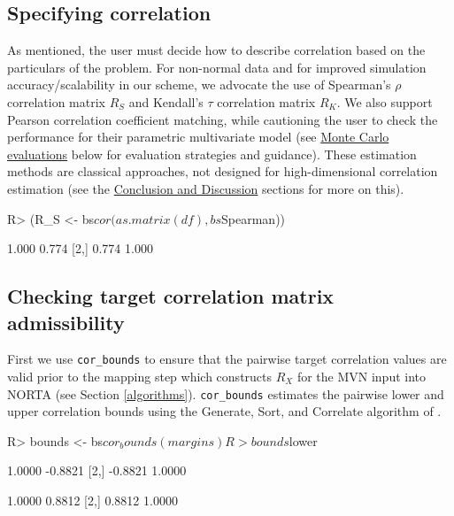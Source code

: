\documentclass[
]{jss}
\begin{document}
\hypertarget{specifying-correlation}{%
\subsection{Specifying correlation}\label{specifying-correlation}}

As mentioned, the user must decide how to describe correlation based on the particulars of the problem. For non-normal data and for improved simulation accuracy/scalability in our scheme, we advocate the use of Spearman's \(\rho\) correlation matrix \(R_S\) and Kendall's \(\tau\) correlation matrix \(R_K\). We also support Pearson correlation coefficient matching, while cautioning the user to check the performance for their parametric multivariate model (see \protect\hyperlink{simulations}{Monte Carlo evaluations} below for evaluation strategies and guidance). These estimation methods are classical approaches, not designed for high-dimensional correlation estimation (see the \href{\%7B\#discussion}{Conclusion and Discussion} sections for more on this).

\begin{CodeChunk}
\begin{CodeInput}
R> (R_S <- bs$cor(as.matrix(df), bs$Spearman))
\end{CodeInput}
\begin{CodeOutput}
      [,1]  [,2]
[1,] 1.000 0.774
[2,] 0.774 1.000
\end{CodeOutput}
\end{CodeChunk}

\hypertarget{checking-target-correlation-matrix-admissibility}{%
\subsection{Checking target correlation matrix admissibility}\label{checking-target-correlation-matrix-admissibility}}

First we use \texttt{cor\_bounds} to ensure that the pairwise target correlation values are valid prior to the mapping step which constructs \(R_X\) for the MVN input into NORTA (see Section \ref{algorithms}). \texttt{cor\_bounds} estimates the pairwise lower and upper correlation bounds using the Generate, Sort, and Correlate algorithm of \citet{DH2011}.

\begin{CodeChunk}
\begin{CodeInput}
R> bounds <- bs$cor_bounds(margins)
R> bounds$lower
\end{CodeInput}
\begin{CodeOutput}
        [,1]    [,2]
[1,]  1.0000 -0.8821
[2,] -0.8821  1.0000
\end{CodeOutput}
\begin{CodeOutput}
       [,1]   [,2]
[1,] 1.0000 0.8812
[2,] 0.8812 1.0000
\end{CodeOutput}
\end{CodeChunk}
\end{document}
